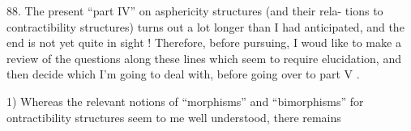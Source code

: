 88.     The present ``part IV''  on asphericity structures (and their rela-%
tions to contractibility structures)  turns out a lot longer than I had
anticipated,  and the end is not yet quite in sight !  Therefore,  before
pursuing,  I woud like to make a review of the questions  along
these lines which seem to require elucidation,  and then decide which I'm
going to deal with,  before going over to part V .

1)   Whereas the relevant notions of ``morphisms''  and ``bimorphisms''
for ontractibility structures seem to me well understood,  there remains

